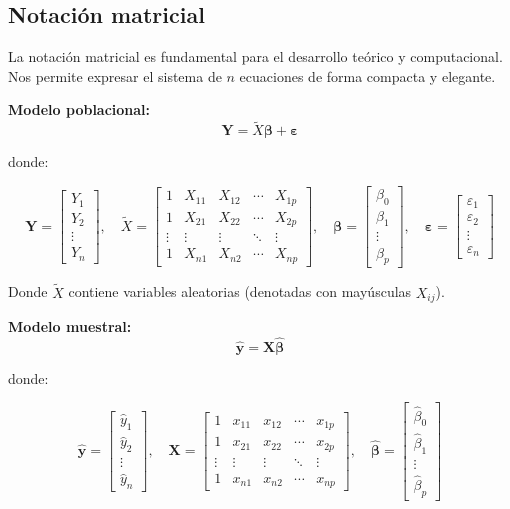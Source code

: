 \documentclass[
  letterpaper,
  DIV=11,
  numbers=noendperiod]{scrreprt}
\begin{document}
\subsection{Notación matricial}\label{notaciuxf3n-matricial}

La notación matricial es fundamental para el desarrollo teórico y
computacional. Nos permite expresar el sistema de \(n\) ecuaciones de
forma compacta y elegante.

\textbf{Modelo poblacional:}
\[\mathbf{Y} = \tilde{X}\boldsymbol{\beta} + \boldsymbol{\varepsilon}\]

donde:

\[\mathbf{Y} = \begin{bmatrix} Y_1 \\ Y_2 \\ \vdots \\ Y_n \end{bmatrix}, \quad
\tilde{X} = \begin{bmatrix}
1 & X_{11} & X_{12} & \cdots & X_{1p} \\
1 & X_{21} & X_{22} & \cdots & X_{2p} \\
\vdots & \vdots & \vdots & \ddots & \vdots \\
1 & X_{n1} & X_{n2} & \cdots & X_{np}
\end{bmatrix}, \quad
\boldsymbol{\beta} = \begin{bmatrix} \beta_0 \\ \beta_1 \\ \vdots \\ \beta_p \end{bmatrix}, \quad
\boldsymbol{\varepsilon} = \begin{bmatrix} \varepsilon_1 \\ \varepsilon_2 \\ \vdots \\ \varepsilon_n \end{bmatrix}\]

Donde \(\tilde{X}\) contiene variables aleatorias (denotadas con
mayúsculas \(X_{ij}\)).

\textbf{Modelo muestral:}
\[\hat{\mathbf{y}} = \mathbf{X}\hat{\boldsymbol{\beta}}\]

donde:

\[\hat{\mathbf{y}} = \begin{bmatrix} \hat{y}_1 \\ \hat{y}_2 \\ \vdots \\ \hat{y}_n \end{bmatrix}, \quad
\mathbf{X} = \begin{bmatrix}
1 & x_{11} & x_{12} & \cdots & x_{1p} \\
1 & x_{21} & x_{22} & \cdots & x_{2p} \\
\vdots & \vdots & \vdots & \ddots & \vdots \\
1 & x_{n1} & x_{n2} & \cdots & x_{np}
\end{bmatrix}, \quad
\hat{\boldsymbol{\beta}} = \begin{bmatrix} \hat{\beta}_0 \\ \hat{\beta}_1 \\ \vdots \\ \hat{\beta}_p \end{bmatrix}\]
\end{document}
